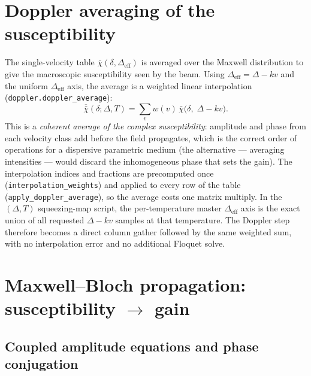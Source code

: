 \documentclass[11pt]{article}
\newcommand{\eff}{\mathrm{eff}}
\newcommand{\code}[1]{\texttt{#1}}
\newcommand{\rhobar}{\bar{\chi}}
\begin{document}
\section{Doppler averaging of the susceptibility}

The single-velocity table $\rhobar(\delta,\Delta_\eff)$ is averaged over the
Maxwell distribution to give the macroscopic susceptibility seen by the beam.
Using $\Delta_\eff=\Delta-kv$ and the uniform $\Delta_\eff$ axis, the average is a
weighted linear interpolation (\code{doppler.doppler\_average}):
\begin{equation}
\overline{\rhobar}(\delta;\Delta,T)
=\sum_v w(v)\,\rhobar\big(\delta,\;\Delta-kv\big).
\label{eq:doppleravg}
\end{equation}
This is a \emph{coherent average of the complex susceptibility}: amplitude and
phase from each velocity class add before the field propagates, which is the
correct order of operations for a dispersive parametric medium (the alternative ---
averaging intensities --- would discard the inhomogeneous phase that sets the
gain). The interpolation indices and fractions are precomputed once
(\code{interpolation\_weights}) and applied to every row of the table
(\code{apply\_doppler\_average}), so the average costs one matrix multiply. In the
$(\Delta,T)$ squeezing-map script, the per-temperature master $\Delta_\eff$ axis
is the exact union of all requested $\Delta-kv$ samples at that temperature. The
Doppler step therefore becomes a direct column gather followed by the same
weighted sum, with no interpolation error and no additional Floquet solve.

\section{Maxwell--Bloch propagation: susceptibility \boldmath$\to$ gain}
\label{sec:mb}

\subsection{Coupled amplitude equations and phase conjugation}
\end{document}

